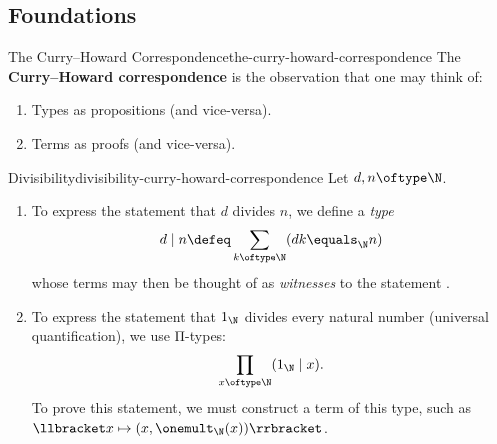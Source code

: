 \subsection{Foundations}\label{subsection-the-curry-howard-correspondence-foundations}
\begin{definition}{The Curry--Howard Correspondence}{the-curry-howard-correspondence}%
    The \textbf{Curry--Howard correspondence} is the observation that one may think of:
    \begin{enumerate}
        \item\label{the-curry-howard-correspondence-types}Types as propositions (and vice-versa).
        \item\label{the-curry-howard-correspondence-terms}Terms as proofs (and vice-versa).
    \end{enumerate}
\end{definition}
\begin{example}{Divisibility}{divisibility-curry-howard-correspondence}%
    Let $d,n\oftype\N$.
    \begin{enumerate}
        \item\label{divisibility-curry-howard-correspondence-1}To express the statement that $d$ divides $n$, we define a \textit{type}
            \[
                d\mid n%
                \defeq%
                \sum_{k\oftype\N}(dk\equals_{\N}n)%
            \]%
            whose terms may then be thought of as \textit{witnesses} to the statement .
        \item\label{divisibility-curry-howard-correspondence-2}To express the statement that $1_{\N}$ divides every natural number (universal quantification), we use Π-types:
            \[
                \prod_{x\oftype\N}(1_{\N}\mid x).%
            \]%
            To prove this statement, we must construct a term of this type, such as $\llbracket x\mapsto(x,\onemult_{\N}(x))\rrbracket$.
    \end{enumerate}
\end{example}
